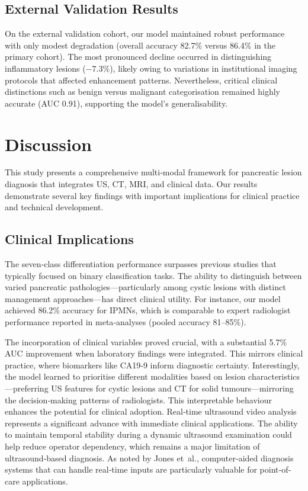 \documentclass[a4paper, fleqn]{cas-dc}
\begin{document}
    \subsection{External Validation Results}
    On the external validation cohort, our model maintained robust performance
    with only modest degradation (overall accuracy 82.7\% versus 86.4\% in the primary
    cohort). The most pronounced decline occurred in distinguishing inflammatory
    lesions ($-$7.3\%), likely owing to variations in institutional imaging
    protocols that affected enhancement patterns. Nevertheless, critical
    clinical distinctions such as benign versus malignant categorisation
    remained highly accurate (AUC 0.91), supporting the model's generalisability.

    \section{Discussion}
    \label{sec:discussion}

    This study presents a comprehensive multi‐modal framework for pancreatic
    lesion diagnosis that integrates US, CT, MRI, and clinical data. Our results
    demonstrate several key findings with important implications for clinical
    practice and technical development.

    \subsection{Clinical Implications}
    The seven‐class differentiation performance surpasses previous studies that
    typically focused on binary classification tasks\citep{Chen2023,Gao2022}. The
    ability to distinguish between varied pancreatic pathologies—particularly among
    cystic lesions with distinct management approaches—has direct clinical utility.
    For instance, our model achieved 86.2\% accuracy for IPMNs, which is comparable
    to expert radiologist performance reported in meta‐analyses (pooled accuracy
    81–85\%)\citep{Zhang2021}.

    The incorporation of clinical variables proved crucial, with a substantial 5.7\%
    AUC improvement when laboratory findings were integrated. This mirrors clinical
    practice, where biomarkers like CA19‑9 inform diagnostic certainty. Interestingly,
    the model learned to prioritise different modalities based on lesion
    characteristics—preferring US features for cystic lesions and CT for solid
    tumours—mirroring the decision‑making patterns of radiologists. This interpretable
    behaviour enhances the potential for clinical adoption. \citep{liu_swin_2021}
    Real‐time ultrasound video analysis represents a significant advance with immediate
    clinical applications. The ability to maintain temporal stability during a
    dynamic ultrasound examination could help reduce operator dependency, which remains
    a major limitation of ultrasound‐based diagnosis. As noted by Jones et~al.\citep{Jones2023},
    computer‑aided diagnosis systems that can handle real‐time inputs are
    particularly valuable for point‐of‐care applications.
\end{document}

